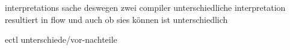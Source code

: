 interpretations sache\newline
deswegen zwei compiler\newline
unterschiedliche interpretation resultiert in flow und auch ob sies können ist unterschiedlich\newline

ectl unterschiede/vor-nachteile\newline
